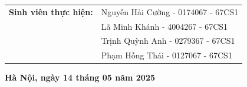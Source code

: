 \documentclass[main.tex]{subfiles}
\begin{document}
\begin{titlepage}
\begin{center}
\begin{table}[H]
\begin{tabular}{l l}
{\textbf{\fontsize{16pt}{0pt}\selectfont Sinh viên thực hiện:}} & {\fontsize{16pt}{0pt}\selectfont Nguyễn Hải Cường - 0174067 - 67CS1}\vspace{6pt}\\
& {\fontsize{16pt}{0pt}\selectfont Lã Minh Khánh - 4004267 - 67CS1}\vspace{6pt}\\
& {\fontsize{16pt}{0pt}\selectfont Trịnh Quỳnh Anh - 0279367 - 67CS1}\vspace{6pt}\\
& {\fontsize{16pt}{0pt}\selectfont Phạm Hồng Thái - 0127067 - 67CS1}\vspace{6pt}\\

\end{tabular}
\end{table}

\vspace{2cm}
\textbf{\fontsize{14pt}{0pt}\selectfont Hà Nội, ngày 14 tháng 05 năm 2025}\\

\end{center}
\end{titlepage}
\end{document}
